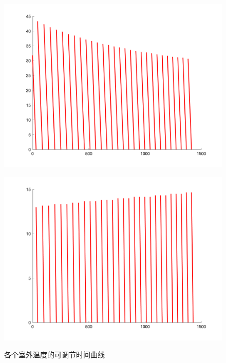 \documentclass[withoutpreface,bwprint]{cumcmthesis} %
\begin{document}
\begin{figure}[h]
    \centering
    \begin{minipage}[c]{0.35\textwidth}
        \includegraphics[width=1\textwidth]{figures/2-2-25-up.png}
    \label{fig:my_label}
    \end{minipage}
\begin{minipage}[c]{0.35\textwidth}
    \includegraphics[width=1\textwidth]{figures/2-2-25-down.png}
    \label{fig:my_label}
\end{minipage}
 \caption{各个室外温度的可调节时间曲线}
\end{figure}
\end{document}
